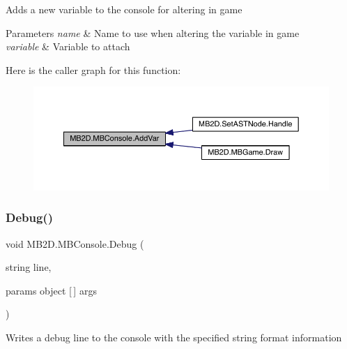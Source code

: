 Adds a new variable to the console for altering in game 


\begin{DoxyParams}{Parameters}
{\em name} & Name to use when altering the variable in game\\
\hline
{\em variable} & Variable to attach\\
\hline
\end{DoxyParams}
Here is the caller graph for this function\+:
\nopagebreak
\begin{figure}[H]
\begin{center}
\leavevmode
\includegraphics[width=350pt]{class_m_b2_d_1_1_m_b_console_aeff7888e763a415aeccadc347e09828d_icgraph}
\end{center}
\end{figure}
\hypertarget{class_m_b2_d_1_1_m_b_console_a6f0c0f179b2fef32a130a5e1d4957a70}{}\label{class_m_b2_d_1_1_m_b_console_a6f0c0f179b2fef32a130a5e1d4957a70} 
\subsubsection{\texorpdfstring{Debug()}{Debug()}\hspace{0.1cm}{\footnotesize\ttfamily [1/4]}}
{\footnotesize\ttfamily void M\+B2\+D.\+M\+B\+Console.\+Debug (\begin{DoxyParamCaption}\item[{string}]{line,  }\item[{params object \mbox{[}$\,$\mbox{]}}]{args }\end{DoxyParamCaption})\hspace{0.3cm}{\ttfamily [inline]}}



Writes a debug line to the console with the specified string format information 


